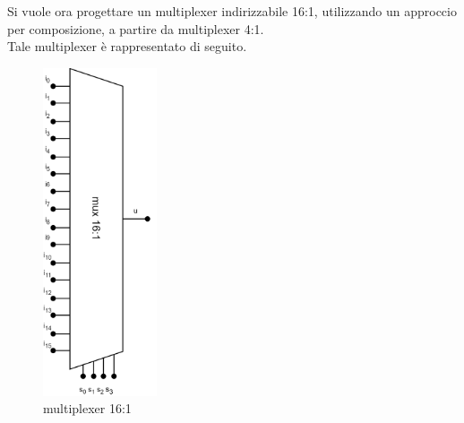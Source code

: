 Si vuole ora progettare un multiplexer indirizzabile 16:1, utilizzando un approccio per composizione, a partire da multiplexer 4:1.\\
Tale multiplexer è rappresentato di seguito.
\begin{figure}[H]
	\centering
	\includegraphics[width=0.3\textwidth]{img/mux_16-1}
	\caption{multiplexer 16:1}
	\label{mux_16:1} 
\end{figure}

